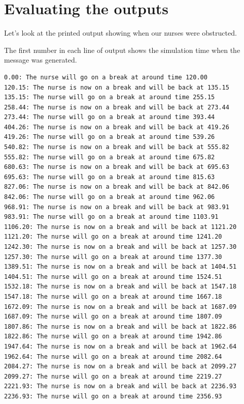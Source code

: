 \documentclass[
  letterpaper,
  DIV=11,
  numbers=noendperiod]{scrreprt}
\begin{document}
\section{Evaluating the outputs}\label{evaluating-the-outputs-3}

Let's look at the printed output showing when our nurses were
obstructed.

The first number in each line of output shows the simulation time when
the message was generated.

\begin{verbatim}
0.00: The nurse will go on a break at around time 120.00
120.15: The nurse is now on a break and will be back at 135.15
135.15: The nurse will go on a break at around time 255.15
258.44: The nurse is now on a break and will be back at 273.44
273.44: The nurse will go on a break at around time 393.44
404.26: The nurse is now on a break and will be back at 419.26
419.26: The nurse will go on a break at around time 539.26
540.82: The nurse is now on a break and will be back at 555.82
555.82: The nurse will go on a break at around time 675.82
680.63: The nurse is now on a break and will be back at 695.63
695.63: The nurse will go on a break at around time 815.63
827.06: The nurse is now on a break and will be back at 842.06
842.06: The nurse will go on a break at around time 962.06
968.91: The nurse is now on a break and will be back at 983.91
983.91: The nurse will go on a break at around time 1103.91
1106.20: The nurse is now on a break and will be back at 1121.20
1121.20: The nurse will go on a break at around time 1241.20
1242.30: The nurse is now on a break and will be back at 1257.30
1257.30: The nurse will go on a break at around time 1377.30
1389.51: The nurse is now on a break and will be back at 1404.51
1404.51: The nurse will go on a break at around time 1524.51
1532.18: The nurse is now on a break and will be back at 1547.18
1547.18: The nurse will go on a break at around time 1667.18
1672.09: The nurse is now on a break and will be back at 1687.09
1687.09: The nurse will go on a break at around time 1807.09
1807.86: The nurse is now on a break and will be back at 1822.86
1822.86: The nurse will go on a break at around time 1942.86
1947.64: The nurse is now on a break and will be back at 1962.64
1962.64: The nurse will go on a break at around time 2082.64
2084.27: The nurse is now on a break and will be back at 2099.27
2099.27: The nurse will go on a break at around time 2219.27
2221.93: The nurse is now on a break and will be back at 2236.93
2236.93: The nurse will go on a break at around time 2356.93

\end{verbatim}
\end{document}
